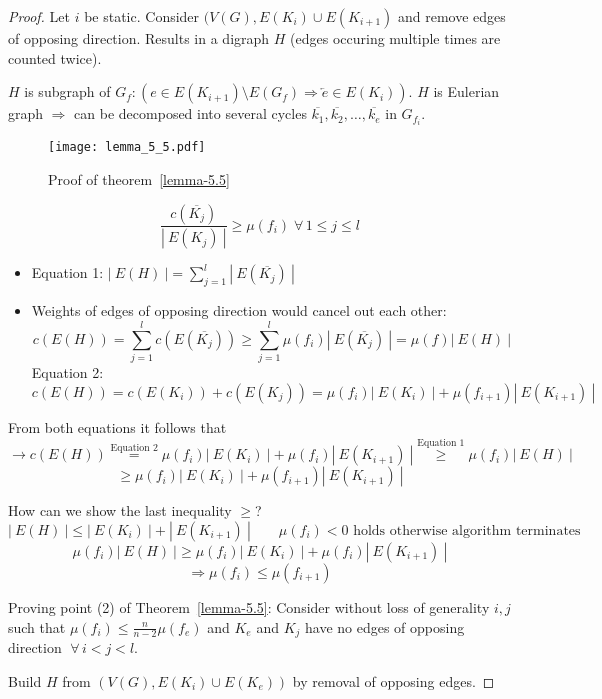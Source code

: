 \documentclass{article}
\newcommand{\card}[1]{\left|\:\!#1\:\!\right|}
\newcommand{\fall}{\;\forall\,}
\begin{document}
\begin{proof}
  Let $i$ be static. Consider $(V(G), E(K_i) \cup E(K_{i+1})$ and remove edges of opposing direction.
  Results in a digraph $H$ (edges occuring multiple times are counted twice).

  $H$ is subgraph of $G_f: (e \in E(K_{i+1}) \setminus E(G_f) \Rightarrow \overleftarrow{e} \in E(K_i))$.
  $H$ is Eulerian graph $\Rightarrow$ can be decomposed into several cycles $\overline{k_1}, \overline{k_2}, \ldots, \overline{k_e}$ in $G_{f_i}$.

  \begin{figure}[h]
   \begin{center}
    \texttt{[image: lemma\_5\_5.pdf]}
    \caption{Proof of theorem~\ref{lemma-5.5}}
   \end{center}
  \end{figure}

  \[ \frac{c(\overline{K_j})}{\card{E(K_j)}} \geq \mu(f_i) \fall 1 \leq j \leq l \]
  \begin{itemize}
    \item Equation 1:
      $\card{E(H)} = \sum_{j=1}^l \card{E(\overline{K_j})}$
    \item Weights of edges of opposing direction would cancel out each other:
      \[ c(E(H)) = \sum_{j=1}^l c(E(\overline{K_j}))
        \geq \sum_{j=1}^l \mu(f_i) \card{E(\overline{K_j})} = \mu(f) \card{E(H)} \]
      Equation 2:
      \[ c(E(H)) = c(E(K_i)) + c(E(K_{j})) = \mu(f_i) \card{E(K_i)} + \mu(f_{i+1}) \card{E(K_{i+1})} \]
  \end{itemize}
  From both equations it follows that
  \[
    \rightarrow c(E(H))
      \stackrel{\text{Equation 2}}{=} \mu(f_i) \card{E(K_i)} + \mu(f_i) \card{E(K_{i+1})}
      \stackrel{\text{Equation 1}}{\geq} \mu(f_i) \card{E(H)}
  \] \[
      \geq \mu(f_i) \card{E(K_i)} + \mu(f_{i+1}) \card{E(K_{i+1})}
  \]

  How can we show the last inequality $\geq$?
  \[
    \card{E(H)} \leq \card{E(K_i)} + \card{E(K_{i+1})} \qquad \mu(f_i) < 0 \text{ holds otherwise algorithm terminates}
  \] \[
    \mu(f_i) \card{E(H)} \geq \mu(f_i) \card{E(K_i)} + \mu(f_i) \card{E(K_{i+1})}
  \] \[
    \Rightarrow \mu(f_i) \leq \mu(f_{i+1})
  \]

  Proving point (2) of Theorem~\ref{lemma-5.5}: Consider without loss of generality $i,j$ such that $\mu(f_i) \leq \frac{n}{n-2} \mu(f_e)$ and $K_e$ and $K_j$ have no edges of opposing direction $\fall i < j < l$.

  Build $H$ from $(V(G), E(K_i) \cup E(K_e))$ by removal of opposing edges.


\end{proof}
\end{document}
